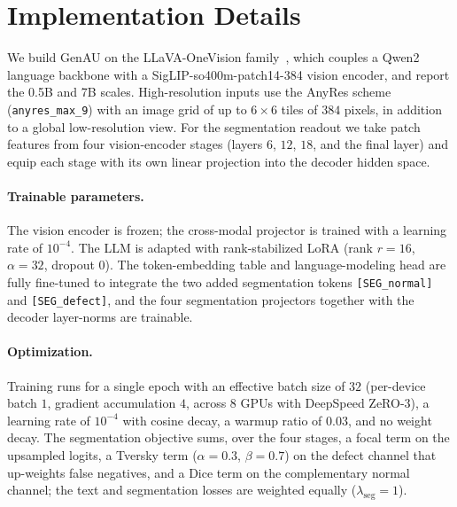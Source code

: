 \section{Implementation Details}
\label{app:impl}
We build GenAU on the LLaVA-OneVision family~\cite{li2025llavaonevision}, which couples a Qwen2 language backbone with a SigLIP-so400m-patch14-384 vision encoder, and report the 0.5B and 7B scales. High-resolution inputs use the AnyRes scheme (\texttt{anyres\_max\_9}) with an image grid of up to $6\times6$ tiles of $384$ pixels, in addition to a global low-resolution view. For the segmentation readout we take patch features from four vision-encoder stages (layers $6$, $12$, $18$, and the final layer) and equip each stage with its own linear projection into the decoder hidden space.

\paragraph{Trainable parameters.}
The vision encoder is frozen; the cross-modal projector is trained with a learning rate of $10^{-4}$. The LLM is adapted with rank-stabilized LoRA (rank $r=16$, $\alpha=32$, dropout $0$). The token-embedding table and language-modeling head are fully fine-tuned to integrate the two added segmentation tokens \texttt{[SEG\_normal]} and \texttt{[SEG\_defect]}, and the four segmentation projectors together with the decoder layer-norms are trainable.

\paragraph{Optimization.}
Training runs for a single epoch with an effective batch size of $32$ (per-device batch $1$, gradient accumulation $4$, across $8$ GPUs with DeepSpeed ZeRO-3), a learning rate of $10^{-4}$ with cosine decay, a warmup ratio of $0.03$, and no weight decay. The segmentation objective sums, over the four stages, a focal term on the upsampled logits, a Tversky term ($\alpha=0.3$, $\beta=0.7$) on the defect channel that up-weights false negatives, and a Dice term on the complementary normal channel; the text and segmentation losses are weighted equally ($\lambda_{\mathrm{seg}}=1$).

